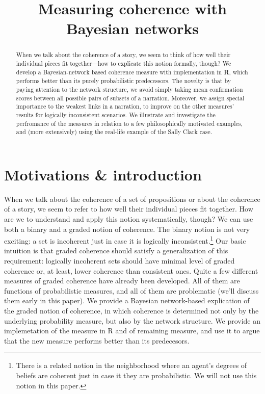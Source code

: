 \documentclass[10pt,]{scrartcl}
\title{Measuring coherence with Bayesian networks}
\author{}
\date{\vspace{-2.5em}}
\begin{document}
\maketitle

\begin{abstract}  When we talk about the  coherence of a story, we seem to think of how well their individual pieces fit together---how  to explicate this notion formally, though?  We  develop a Bayesian-network based coherence measure with implementation in \textbf{\textsf{R}}, which  performs better than its purely probabilistic predecessors. The novelty is that  by paying attention to  the network structure,  we avoid simply taking mean confirmation scores between all possible pairs of subsets of a narration. Moreover, we assign special importance to the weakest links in a narration, to improve on the other measures' results for logically inconsistent scenarios.  
 We illustrate  and investigate the  perfromance of the measures in relation to a few philosophically motivated examples, and (more extensively) using the real-life example of the  Sally Clark case. 
\end{abstract}






\section{Motivations \& introduction}


When we talk about the coherence of a set of propositions or about the 
coherence of a story, we seem to refer to how well their individual
pieces fit together. How are we to understand and apply this notion
systematically, though?  We can use both a binary and a graded notion of coherence. The binary notion is not very exciting: a set is incoherent
just in case it is logically
inconsistent.\footnote{There is a related notion in the neighborhood where an agent's  degrees of beliefs are coherent just in case it they are probabilistic. We will not use this notion in this paper.}  Our basic intuition is that graded coherence should satisfy  a generalization of this requirement: logically incoherent sets should have minimal level of graded coherence or, at least, lower coherence than consistent ones.   Quite a few different measures of graded coherence have already been developed. All of them are functions of probabilistic measures, and all of them are problematic (we'll discuss  them  early in this paper).  We provide a Bayesian network-based explication of the graded notion of coherence, in which    coherence is determined not only by the underlying probability measure, but also by the network structure. We provide an implemetation of the measure in \textsf{R} and of remaining measure, and use it to argue that the new measure performs better than its predecesors. 
\end{document}

